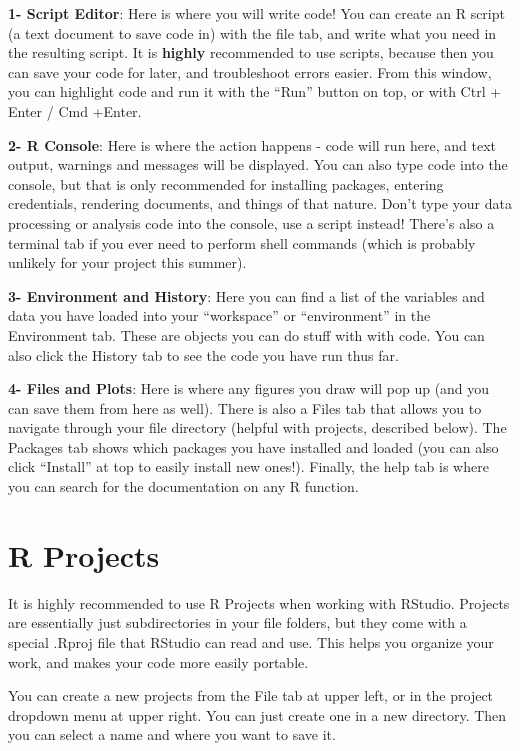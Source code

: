 \documentclass[
  letterpaper,
  DIV=11,
  numbers=noendperiod]{scrreprt}
\begin{document}
\textbf{1- Script Editor}: Here is where you will write code! You can
create an R script (a text document to save code in) with the file tab,
and write what you need in the resulting script. It is \textbf{highly}
recommended to use scripts, because then you can save your code for
later, and troubleshoot errors easier. From this window, you can
highlight code and run it with the ``Run'' button on top, or with Ctrl +
Enter / Cmd +Enter.

\textbf{2- R Console}: Here is where the action happens - code will run
here, and text output, warnings and messages will be displayed. You can
also type code into the console, but that is only recommended for
installing packages, entering credentials, rendering documents, and
things of that nature. Don't type your data processing or analysis code
into the console, use a script instead! There's also a terminal tab if
you ever need to perform shell commands (which is probably unlikely for
your project this summer).

\textbf{3- Environment and History}: Here you can find a list of the
variables and data you have loaded into your ``workspace'' or
``environment'' in the Environment tab. These are objects you can do
stuff with with code. You can also click the History tab to see the code
you have run thus far.

\textbf{4- Files and Plots}: Here is where any figures you draw will pop
up (and you can save them from here as well). There is also a Files tab
that allows you to navigate through your file directory (helpful with
projects, described below). The Packages tab shows which packages you
have installed and loaded (you can also click ``Install'' at top to
easily install new ones!). Finally, the help tab is where you can search
for the documentation on any R function.

\section{R Projects}\label{sec-rprojects}

It is highly recommended to use R Projects when working with RStudio.
Projects are essentially just subdirectories in your file folders, but
they come with a special .Rproj file that RStudio can read and use. This
helps you organize your work, and makes your code more easily portable.

You can create a new projects from the File tab at upper left, or in the
project dropdown menu at upper right. You can just create one in a new
directory. Then you can select a name and where you want to save it.
\end{document}
